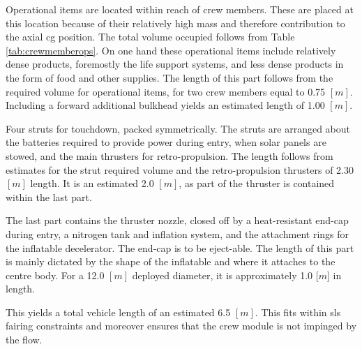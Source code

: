 Operational items are located within reach of crew members. These are placed at this location because of their relatively high mass and therefore contribution to the axial \gls{cg} position. The total volume occupied follows from Table \ref{tab:crewmemberops}. On one hand these operational items include relatively dense products, foremostly the life support systems, and less dense products in the form of food and other supplies.  The length of this part follows from the required volume for operational items, for two crew members equal to 0.75 $[m]$. Including a forward additional bulkhead yields an estimated length of 1.00 $[m]$.


Four struts for touchdown, packed symmetrically. The struts are arranged about the batteries required to provide power during entry, when solar panels are stowed, and the main thrusters for retro-propulsion. The length follows from estimates for the strut required volume and the retro-propulsion thrusters of 2.30 $[m]$ length. It is an estimated 2.0 $[m]$, as part of the thruster is contained within the last part.

The last part contains the thruster nozzle, closed off by a heat-resistant end-cap during entry, a nitrogen tank and inflation system, and the attachment rings for the inflatable decelerator. The end-cap is to be eject-able. The length of this part is mainly dictated by the shape of the inflatable and where it attaches to the centre body. For a 12.0 $[m]$ deployed diameter, it is approximately 1.0 [$m$] in length.

This yields a total vehicle length of an estimated 6.5 $[m]$. This fits within \gls{sls} fairing constraints  and moreover ensures that the crew module is not impinged by the flow.

